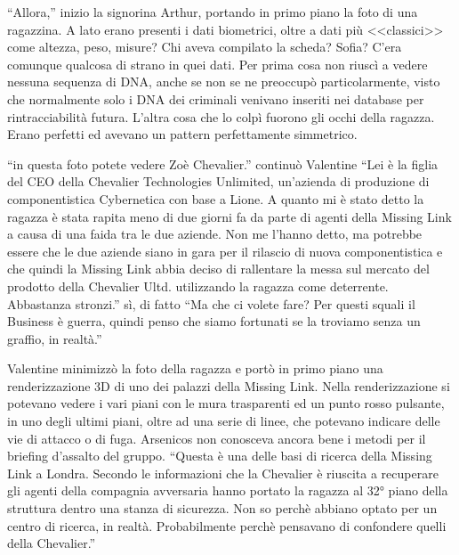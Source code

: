     ``Allora,'' inizio la signorina Arthur, portando in primo piano la foto di una ragazzina. A lato erano presenti i
    dati biometrici, oltre a dati più <<classici>> come altezza, peso, misure? Chi aveva compilato la scheda? Sofia?
    C'era comunque qualcosa di strano in quei dati. Per prima cosa non riuscì a vedere nessuna sequenza di DNA, anche se
    non se ne preoccupò particolarmente, visto che normalmente solo i DNA dei criminali venivano inseriti nei database
    per rintracciabilità futura. L'altra cosa che lo colpì fuorono gli occhi della ragazza. Erano perfetti ed avevano un
    pattern perfettamente simmetrico.
    
    ``in questa foto potete vedere Zoè Chevalier.'' continuò Valentine ``Lei è la figlia del CEO della Chevalier
    Technologies Unlimited, un'azienda di produzione di componentistica Cybernetica con base a Lione. A quanto mi è
    stato detto la ragazza è stata rapita meno di due giorni fa da parte di agenti della Missing Link a causa di una
    faida tra le due aziende. Non me l'hanno detto, ma potrebbe essere che le due aziende siano in gara per il rilascio
    di nuova componentistica e che quindi la Missing Link abbia deciso di rallentare la messa sul mercato del prodotto
    della Chevalier Ultd. utilizzando la ragazza come deterrente. Abbastanza stronzi.'' sì, di fatto ``Ma che ci volete
    fare? Per questi squali il Business è guerra, quindi penso che siamo fortunati se la troviamo senza un graffio, in
    realtà.'' 

    Valentine minimizzò la foto della ragazza e portò in primo piano una renderizzazione 3D di uno dei palazzi della
    Missing Link. Nella renderizzazione si potevano vedere i vari piani con le mura trasparenti ed un punto rosso
    pulsante, in uno degli ultimi piani, oltre ad una serie di linee, che potevano indicare delle vie di attacco o di
    fuga. Arsenicos non conosceva ancora bene i metodi per il briefing d'assalto del gruppo. ``Questa è una delle basi
    di ricerca della Missing Link a Londra. Secondo le informazioni che la Chevalier è riuscita a recuperare gli agenti
    della compagnia avversaria hanno portato la ragazza al 32° piano della struttura dentro una stanza di sicurezza. Non
    so perchè abbiano optato per un centro di ricerca, in realtà. Probabilmente perchè pensavano di confondere quelli
    della Chevalier.''

